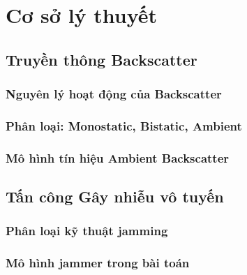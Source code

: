 \chapter{Cơ sở lý thuyết}
\label{chap:background}

\section{Truyền thông Backscatter}
\label{sec:bg:backscatter}

\subsection{Nguyên lý hoạt động của Backscatter}
\label{subsec:bg:backscatter:principle}

\subsection{Phân loại: Monostatic, Bistatic, Ambient}
\label{subsec:bg:backscatter:types}

\subsection{Mô hình tín hiệu Ambient Backscatter}
\label{subsec:bg:backscatter:signal}

\section{Tấn công Gây nhiễu vô tuyến}
\label{sec:bg:jamming}

\subsection{Phân loại kỹ thuật jamming}
\label{subsec:bg:jamming:types}

\subsection{Mô hình jammer trong bài toán}
\label{subsec:bg:jamming:model}

